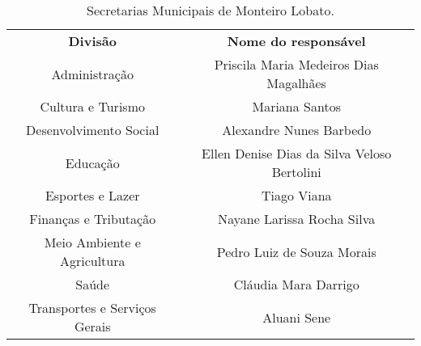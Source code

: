 \begin{table}[htbp]
	\centering
	\caption{Secretarias Municipais de Monteiro Lobato.}
	\begin{tabular}{c|c}
		\rowcolor[rgb]{ .969,  .588,  .275} \textcolor[rgb]{ 1,  1,  1}{\textbf{Divisão}} & \textcolor[rgb]{ 1,  1,  1}{\textbf{Nome do responsável}} \\
		\rowcolor[rgb]{ .992,  .914,  .851} Administração & Priscila Maria Medeiros Dias Magalhães \\
		\rowcolor[rgb]{ .984,  .831,  .706} Cultura e Turismo & Mariana Santos \\
		\rowcolor[rgb]{ .992,  .914,  .851} Desenvolvimento Social & Alexandre Nunes Barbedo \\
		\rowcolor[rgb]{ .984,  .831,  .706} Educação & Ellen Denise Dias da Silva Veloso Bertolini \\
		\rowcolor[rgb]{ .992,  .914,  .851} Esportes e Lazer & Tiago Viana \\
		\rowcolor[rgb]{ .984,  .831,  .706} Finanças e Tributação & Nayane Larissa Rocha Silva \\
		\rowcolor[rgb]{ .992,  .914,  .851} Meio Ambiente e Agricultura & Pedro Luiz de Souza Morais \\
		\rowcolor[rgb]{ .984,  .831,  .706} Saúde & Cláudia Mara Darrigo \\
		\rowcolor[rgb]{ .992,  .914,  .851} Transportes e Serviços Gerais & Aluani Sene \\
	\end{tabular}%
	\label{tab:secretarias}%
\end{table}%